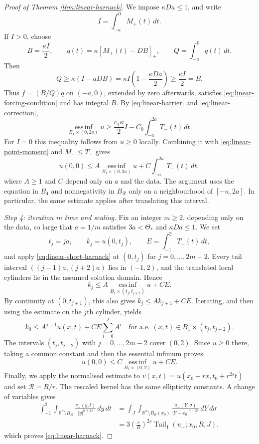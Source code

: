 \documentclass[10pt]{amsart}
\theoremstyle{plain}
\theoremstyle{definition}
\theoremstyle{remark}
\numberwithin{equation}{section}
\newcommand{\R}{\mathbb R}
\begin{document}
\begin{proof}[Proof of Theorem \ref{thm:linear-harnack}]
We impose $\kappa Da\le1$, and write
\[
I=\int_{-a}^0M_+(t)\,dt.
\]
If $I>0$, choose
\[
B=\frac{\kappa I}{2},\qquad
q(t)=\kappa[M_+(t)-DB]_+,\qquad
Q=\int_{-a}^0q(t)\,dt.
\]
Then
\[
Q\ge\kappa(I-aDB)
=\kappa I\left(1-\frac{\kappa Da}{2}\right)
\ge\frac{\kappa I}{2}=B.
\]
Thus $f=(B/Q)q$ on $(-a,0)$, extended by zero afterwards,
satisfies \eqref{eq:linear-forcing-condition} and has integral $B$.
By \eqref{eq:linear-barrier} and \eqref{eq:linear-correction},
\begin{equation}\label{eq:linear-moment-lower}
\operatorname*{ess\,inf}_{B_1\times(0,2a)}u
\ge\frac{c_1\kappa}{2}I-C_0\int_{-a}^{2a}T_-(t)\,dt.
\end{equation}
For $I=0$ this inequality follows from $u\ge0$ locally.
Combining it with \eqref{eq:linear-point-moment} and $M_-\le T_-$
gives
\begin{equation}\label{eq:linear-short-harnack}
u(0,0)\le
A\operatorname*{ess\,inf}_{B_1\times(0,2a)}u
+C\int_{-a}^{2a}T_-(t)\,dt,
\end{equation}
where $A\ge1$ and $C$ depend only on $a$ and the data.
The argument uses the equation in $B_4$ and nonnegativity in
$B_{\mathcal R}$ only on a neighbourhood of $[-a,2a]$.
In particular, the same estimate applies after translating this interval.

\smallskip
\noindent\emph{Step 4: iteration in time and scaling.}
Fix an integer $m\ge2$, depending only on the data, so large that
$a=1/m$ satisfies $3a<\Theta_*$ and $\kappa Da\le1$.
We set
\[
t_j=ja,\qquad k_j=u(0,t_j),\qquad
E=\int_{-1}^2T_-(t)\,dt,
\]
and apply \eqref{eq:linear-short-harnack} at $(0,t_j)$ for
$j=0,\ldots,2m-2$. Every tail interval
$((j-1)a,(j+2)a)$ lies in $(-1,2)$, and the translated local
cylinders lie in the assumed solution domain. Hence
\[
k_j\le A\operatorname*{ess\,inf}_{B_1\times(t_j,t_{j+2})}u+CE.
\]
By continuity at $(0,t_{j+1})$, this also gives
$k_j\le Ak_{j+1}+CE$. Iterating, and then using the estimate on
the $j$th cylinder, yields
\[
k_0\le A^{j+1}u(x,t)+CE\sum_{i=0}^jA^i
\quad\text{for a.e. }(x,t)\in
B_1\times(t_j,t_{j+2}).
\]
The intervals $(t_j,t_{j+2})$ with $j=0,\ldots,2m-2$ cover $(0,2)$.
Since $u\ge0$ there, taking a common constant
and then the essential infimum proves
\[
u(0,0)\le C\operatorname*{ess\,inf}_{B_1\times(0,2)}u+CE.
\]
Finally, we apply the normalised estimate to
$v(x,t)=u(x_0+rx,t_0+r^{2s}t)$ and set $\mathcal R=R/r$.
The rescaled kernel has the same ellipticity constants. A change
of variables gives
\begin{align*}
\int_{-1}^2\int_{\R^n\setminus B_{\mathcal R}}
\frac{v_-(y,t)}{|y|^{n+2s}}\,dy\,dt
&=\int_J\int_{\R^n\setminus B_R(x_0)}
\frac{u_-(Y,\sigma)}{|Y-x_0|^{n+2s}}\,dY\,d\sigma\\
&=3\left(\frac rR\right)^{2s}
\operatorname{Tail}_1(u_-;x_0,R,J),
\end{align*}
which proves \eqref{eq:linear-harnack}.
\end{proof}
\end{document}
